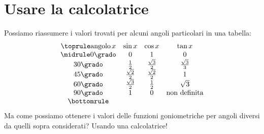 % 
% 
% 
% 
% 

\section{Usare la calcolatrice}
\label{sec:trigo_usocalcolatrice}

Possiamo riassumere i valori trovati per alcuni angoli particolari in una 
tabella:
\[
\begin{array}{cccc}
\toprule
\text{angolo}\, x & \sin x&\cos x & \tan x\\
\midrule
0\grado & 0 & 1 & 0\\
30\grado & \frac{1}{2} & \frac{\sqrt{3}}{2} & \frac{\sqrt{3}}{3}\\
45\grado & \frac{\sqrt{2}}{2} & \frac{\sqrt{2}}{2} & 1\\
60\grado & \frac{\sqrt{3}}{2} & \frac{1}{2} & \sqrt{3}\\
90\grado & 1 & 0 & \text{non definita}\\
\bottomrule
\end{array}
\]
Ma come possiamo ottenere i valori delle funzioni goniometriche per angoli 
diversi da quelli sopra considerati? Usando una calcolatrice!

